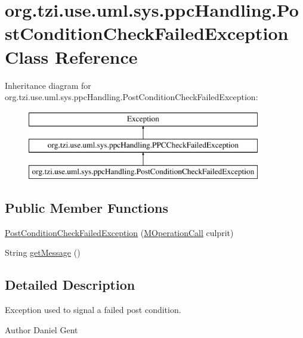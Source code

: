 \hypertarget{classorg_1_1tzi_1_1use_1_1uml_1_1sys_1_1ppc_handling_1_1_post_condition_check_failed_exception}{\section{org.\-tzi.\-use.\-uml.\-sys.\-ppc\-Handling.\-Post\-Condition\-Check\-Failed\-Exception Class Reference}
\label{classorg_1_1tzi_1_1use_1_1uml_1_1sys_1_1ppc_handling_1_1_post_condition_check_failed_exception}
}
Inheritance diagram for org.\-tzi.\-use.\-uml.\-sys.\-ppc\-Handling.\-Post\-Condition\-Check\-Failed\-Exception\-:\begin{figure}[H]
\begin{center}
\leavevmode
\includegraphics[height=3.000000cm]{classorg_1_1tzi_1_1use_1_1uml_1_1sys_1_1ppc_handling_1_1_post_condition_check_failed_exception}
\end{center}
\end{figure}
\subsection*{Public Member Functions}
\begin{DoxyCompactItemize}
\item 
\hyperlink{classorg_1_1tzi_1_1use_1_1uml_1_1sys_1_1ppc_handling_1_1_post_condition_check_failed_exception_aaf05f07c60cf388e4deb52de10fbe617}{Post\-Condition\-Check\-Failed\-Exception} (\hyperlink{classorg_1_1tzi_1_1use_1_1uml_1_1sys_1_1_m_operation_call}{M\-Operation\-Call} culprit)
\item 
String \hyperlink{classorg_1_1tzi_1_1use_1_1uml_1_1sys_1_1ppc_handling_1_1_post_condition_check_failed_exception_a409f8e50178660023da1ee7886cfe079}{get\-Message} ()
\end{DoxyCompactItemize}


\subsection{Detailed Description}
Exception used to signal a failed post condition. \begin{DoxyAuthor}{Author}
Daniel Gent 
\end{DoxyAuthor}


